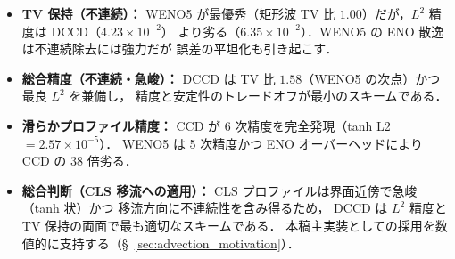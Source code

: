 \begin{tcolorbox}[resultbox, title={実験からの結論}]
\begin{itemize}
  \item \textbf{TV 保持（不連続）：}
        WENO5 が最優秀（矩形波 TV 比 $\mathbf{1.00}$）だが，$L^2$ 精度は DCCD（$4.23 \times 10^{-2}$）
        より劣る（$6.35 \times 10^{-2}$）．WENO5 の ENO 散逸は不連続除去には強力だが
        誤差の平坦化も引き起こす．
  \item \textbf{総合精度（不連続・急峻）：}
        DCCD は TV 比 $1.58$（WENO5 の次点）かつ最良 $L^2$ を兼備し，
        精度と安定性のトレードオフが最小のスキームである．
  \item \textbf{滑らかプロファイル精度：}
        CCD が 6 次精度を完全発現（tanh L2 $= 2.57 \times 10^{-5}$）．
        WENO5 は 5 次精度かつ ENO オーバーヘッドにより CCD の $38$ 倍劣る．
  \item \textbf{総合判断（CLS 移流への適用）：}
        CLS プロファイルは界面近傍で急峻（tanh 状）かつ
        移流方向に不連続性を含み得るため，
        DCCD は $L^2$ 精度と TV 保持の両面で最も適切なスキームである．
        本稿主実装としての採用を数値的に支持する（§~\ref{sec:advection_motivation}）．
\end{itemize}
\end{tcolorbox}
